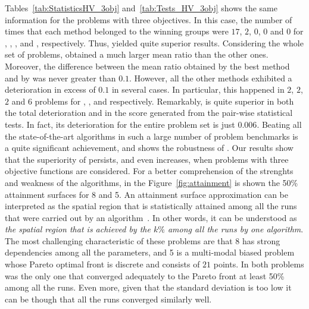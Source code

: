 Tables~\ref{tab:StatisticsHV_3obj} and~\ref{tab:Tests_HV_3obj} shows the same information for the problems with three objectives.
%
In this case, the number of times that each method belonged to the winning groups were $17$, $2$, $0$, $0$ and $0$ 
for \AVSDMOEAD{}, \RMOEA{}, \MOEADDE{}, \NSGAIII{} and \NSGAII{}, respectively.
%
Thus, \AVSDMOEAD{} yielded quite superior results.
%
Considering the whole set of problems, \AVSDMOEAD{} obtained a much larger mean \HV{} ratio than the other ones.
%
Moreover, the difference between the mean \HV{} ratio obtained by the best method and by \AVSDMOEAD{} was never greater than $0.1$.
%
However, all the other methods exhibited a deterioration in excess of $0.1$ in several cases.
%
In particular, this happened in $2$, $2$, $2$ and $6$ problems for \MOEADDE{}, \RMOEA{}, \NSGAIII{} and \NSGAII{} respectively.
%
Remarkably, \AVSDMOEAD{} is quite superior in both the total deterioration and in the score generated from the pair-wise
statistical tests.
%
In fact, its deterioration for the entire problem set is just $0.006$.
%
Beating all the state-of-the-art algorithms in such a large number of problem benchmarks is a quite significant achievement, and shows
the robustness of \AVSDMOEAD{}.
%
Our results show that the superiority of \AVSDMOEAD{} persists, and even increases, when 
problems with three objective functions are considered.
%
For a better comprehension of the strenghts and weakness of the algorithms, in the Figure~\ref{fig:attainment} is shown the 50\% attainment surfaces for \WFG{}8 and \UF{}5.
%
An attainment surface approximation can be interpreted as the spatial region that is statistically attained among all the runs that were carried out by an algorithm~\cite{knowles2005summary, fonseca1996performance}.
%
In other words, it can be understood as \textit{the spatial region that is achieved by the $k\%$ among all the runs by one algorithm}.
%
The most challenging characteristic of these problems are that \WFG{}8 has strong dependencies among all the parameters, and \UF{}5 is a multi-modal biased problem whose Pareto optimal front is discrete and consists of $21$ points.
%
In both problems \AVSDMOEAD{} was the only one that converged adequately to the Pareto front at least 50\% among all the runs.
%
Even more, given that the standard deviation is too low it can be though that all the runs converged similarly well.
%
%
